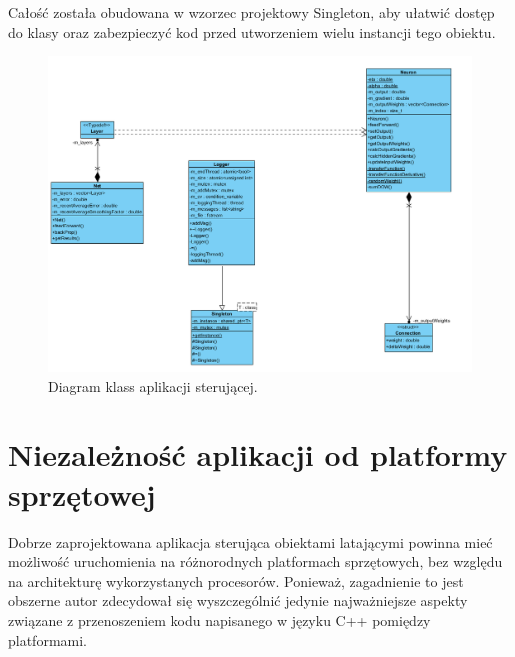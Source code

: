 \begin{itemize}
	Całość została obudowana w wzorzec projektowy Singleton, aby ułatwić dostęp do klasy oraz zabezpieczyć kod przed utworzeniem wielu instancji tego obiektu.
\end{itemize}


\begin{figure}
\centering
\includegraphics[width=0.7\linewidth]{./include/diagram}
\caption{Diagram klass aplikacji sterującej.}
\label{fig:diagram}
\end{figure}

\section{Niezależność aplikacji od platformy sprzętowej}
Dobrze zaprojektowana aplikacja sterująca obiektami latającymi powinna mieć możliwość uruchomienia na różnorodnych platformach sprzętowych, bez względu na architekturę wykorzystanych procesorów. Ponieważ, zagadnienie to jest obszerne autor zdecydował się wyszczególnić jedynie najważniejsze aspekty związane z przenoszeniem kodu napisanego w języku C++ pomiędzy platformami. 

